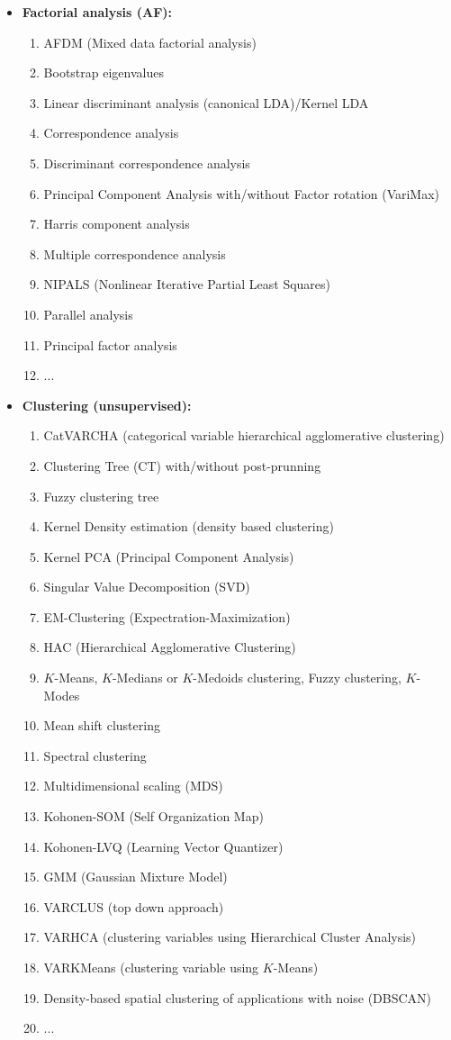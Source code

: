 \begin{itemize}
		\item \textbf{Factorial analysis (AF):}
		\begin{enumerate}
			\item AFDM (Mixed data  factorial analysis)
			\item Bootstrap eigenvalues
			\item Linear discriminant analysis (canonical LDA)/Kernel LDA
			\item Correspondence analysis
			\item Discriminant correspondence analysis
			\item Principal Component Analysis with/without Factor rotation (VariMax)
			\item Harris component analysis
			\item Multiple correspondence analysis
			\item NIPALS (Nonlinear Iterative Partial Least Squares)
			\item Parallel analysis
			\item Principal factor analysis
			\item ...
		\end{enumerate}
		
		\item \textbf{Clustering (unsupervised):}
		\begin{enumerate}
			\item CatVARCHA (categorical variable hierarchical agglomerative clustering)
			\item Clustering Tree (CT) with/without post-prunning
			\item Fuzzy clustering tree
			\item Kernel Density estimation (density based clustering)
			\item Kernel PCA (Principal Component Analysis)
			\item Singular Value Decomposition (SVD)
			\item EM-Clustering (Expectration-Maximization)
			\item HAC (Hierarchical Agglomerative Clustering)
			\item $K$-Means, $K$-Medians or $K$-Medoids clustering, Fuzzy clustering, $K$-Modes
			\item Mean shift clustering
			\item Spectral clustering
			\item Multidimensional scaling (MDS)
			\item Kohonen-SOM (Self Organization Map)
			\item Kohonen-LVQ (Learning Vector Quantizer)
			\item GMM (Gaussian Mixture Model)
			\item VARCLUS (top down approach)
			\item VARHCA (clustering variables using Hierarchical Cluster Analysis)
			\item VARKMeans (clustering variable using $K$-Means)
			\item Density-based spatial clustering of applications with noise (DBSCAN)
			\item ...
		\end{enumerate}
		

\end{itemize}
